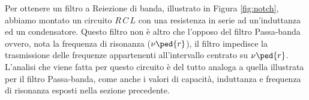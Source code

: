 Per ottenere un filtro a Reiezione di banda, illustrato in Figura \ref{fig:notch}, abbiamo montato un circuito $R\,C\,L$ con una resistenza in serie ad un'induttanza ed un condensatore.
Questo filtro non è altro che l'opposo del filtro Passa-banda ovvero, nota la frequenza di risonanza ($\nu\ped{r}$), il filtro impedisce la trasmissione delle frequenze appartenenti all'intervallo centrato su $\nu\ped{r}$. L'analisi che viene fatta per questo circuito è del tutto analoga a quella illustrata per il filtro Passa-banda, come anche i valori di capacità, induttanza e frequenza di risonanza esposti nella sezione precedente.
